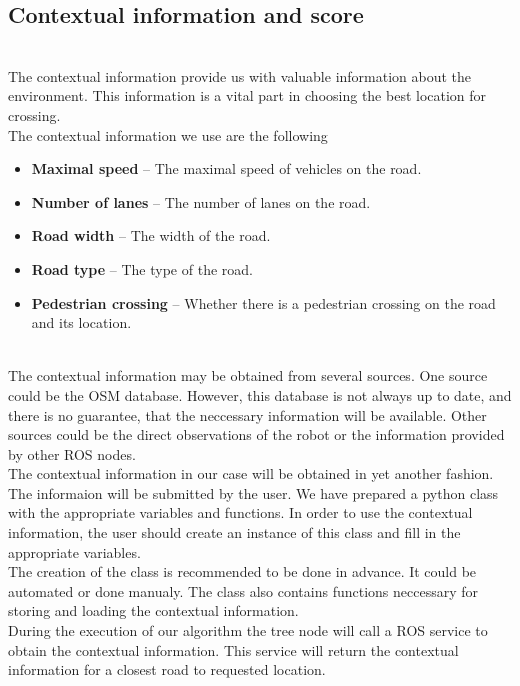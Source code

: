     \subsection{Contextual information and score}
    \label{sec:context}
        \\
            The contextual information provide us with valuable information about the environment. This information is a vital part in choosing the best location for crossing.\\
            The contextual information we use are the following
            \begin{itemize}
                \item \textbf{Maximal speed} -- The maximal speed of vehicles on the road.
                \item \textbf{Number of lanes} -- The number of lanes on the road.
                \item \textbf{Road width} -- The width of the road.
                \item \textbf{Road type} -- The type of the road.
                \item \textbf{Pedestrian crossing} -- Whether there is a pedestrian crossing on the road and its location.
            \end{itemize}
        \\
            The contextual information may be obtained from several sources. One source could be the OSM database. However, this database is not always up to date, and there is no guarantee, that the neccessary information will be available. Other sources could be the direct observations of the robot or the information provided by other ROS nodes.\\
            The contextual information in our case will be obtained in yet another fashion. The informaion will be submitted by the user. We have prepared a python class with the appropriate variables and functions. In order to use the contextual information, the user should create an instance of this class and fill in the appropriate variables.\\
            The creation of the class is recommended to be done in advance. It could be automated or done manualy. The class also contains functions neccessary for storing and loading the contextual information.\\
            During the execution of our algorithm the tree node will call a ROS service to obtain the contextual information. This service will return the contextual information for a closest road to requested location.\\
